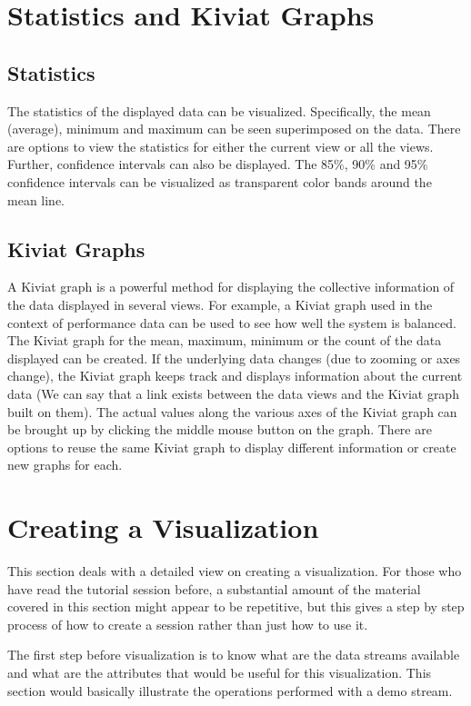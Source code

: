 \section{Statistics and Kiviat Graphs}

\subsection{Statistics}

The statistics of the displayed data can be visualized. Specifically,
the mean (average), minimum and maximum can be seen superimposed on
the data.  There are options to view the statistics for either the
current view or all the views.  Further, confidence intervals can also
be displayed.  The 85\%, 90\% and 95\% confidence intervals can be
visualized as transparent color bands around the mean line.

\subsection{Kiviat Graphs}

A Kiviat graph is a powerful method for displaying the collective
information of the data displayed in several views. For example, a
Kiviat graph used in the context of performance data can be used to
see how well the system is balanced. The Kiviat graph for the mean,
maximum, minimum or the count of the data displayed can be created. If
the underlying data changes (due to zooming or axes change), the
Kiviat graph keeps track and displays information about the current
data (We can say that a link exists between the data views and the
Kiviat graph built on them). The actual values along the various axes
of the Kiviat graph can be brought up by clicking the middle mouse
button on the graph. There are options to reuse the same Kiviat graph
to display different information or create new graphs for each.

\section{Creating a Visualization}

This section deals with a detailed view on creating a
visualization. For those who have read the tutorial session before, a
substantial amount of the material covered in this section might
appear to be repetitive, but this gives a step by step process of how
to create a session rather than just how to use it.

The first step before visualization is to know what are the data
streams available and what are the attributes that would be useful for
this visualization. This section would basically illustrate the
operations performed with a demo stream.

